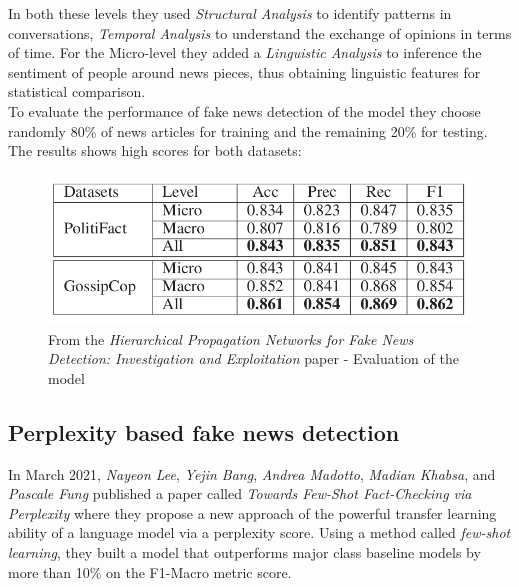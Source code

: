 \documentclass[10pt, english]{report}
\begin{document}
In both these levels they used \textit{Structural Analysis} to identify patterns in conversations, \textit{Temporal Analysis} to understand the exchange of opinions in terms of time. For the Micro-level they added a \textit{Linguistic Analysis} to inference the sentiment of people around news pieces, thus obtaining linguistic features for statistical comparison.\\

To evaluate the performance of fake news detection of the model they choose randomly 80\% of news articles for training and the remaining 20\% for testing. The results shows high scores for both datasets:

\begin{figure}[H]
	\centering
	\includegraphics[scale=0.4]{img/hierarchical_evaluation_results.png}
	\caption{From the \textit{Hierarchical Propagation Networks for Fake News Detection: Investigation and Exploitation} paper - Evaluation of the model}
\end{figure}


\subsection{Perplexity based fake news detection \cite{lee2021towards}}
In March 2021, \textit{Nayeon Lee}, \textit{Yejin Bang}, \textit{Andrea Madotto}, \textit{Madian Khabsa}, and \textit{Pascale Fung} published a paper called \textit{Towards Few-Shot Fact-Checking via Perplexity} where they propose a new approach of the powerful transfer learning ability of a language model via a perplexity score. Using a method called \textit{few-shot learning}, they built a model that outperforms major class baseline models by more than 10\% on the F1-Macro metric score.\\
\end{document}
